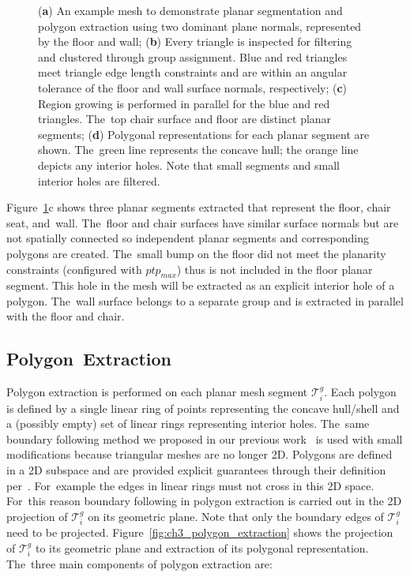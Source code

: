 \begin{figure}[H]
  \caption{(\textbf{a}) An example mesh to demonstrate planar segmentation and polygon extraction using two dominant plane normals, represented by the floor and wall;
  (\textbf{b}) Every triangle is inspected for filtering and clustered through group assignment. Blue and red triangles meet triangle edge length constraints and are within an angular tolerance of the floor and wall surface normals, respectively; (\textbf{c}) Region growing is performed in parallel for the blue and red triangles. The~top chair surface and floor are distinct planar segments;  (\textbf{d}) Polygonal representations for each planar segment are shown. The~green line represents the concave hull; the orange line depicts any interior holes. Note that small segments and small interior holes are filtered. 
  }\label{fig:ch3_planar_segmenti}
\end{figure}

Figure~\ref{fig:ch3_planar_segmenti}c shows three planar segments extracted that represent the floor, chair seat, and~wall. The~floor and chair surfaces have similar surface normals but are not spatially connected so independent planar segments and corresponding polygons are created. The~small bump on the floor did not meet the planarity constraints (configured with $ptp_{max}$) thus is not included in the floor planar segment. This hole in the mesh will be extracted as an explicit interior hole of a polygon. The~wall surface belongs to a separate group and is extracted in parallel with the floor and chair. 

\subsection{Polygon~Extraction}\label{sec:ch3_methods_polylidar_polygon_extraction}

Polygon extraction is performed on each planar mesh segment $\mathcal{T}^{g}_i$. Each polygon is defined by a single linear ring of points representing the concave hull/shell and a (possibly empty) set of linear rings representing interior holes. The~same boundary following method we proposed in our previous work~\cite{castagno_polylidar_2020} is used with small modifications because triangular meshes are no longer 2D.  Polygons are defined in a 2D subspace and are provided explicit guarantees through their definition per~\cite{herring_opengis_2006-1}. For~example the edges in linear rings must not cross in this 2D space.  For~this reason boundary following in polygon extraction is carried out in the 2D projection of $\mathcal{T}^{g}_i$ on its geometric plane. Note that only the boundary edges of $\mathcal{T}^{g}_i$ need to be projected. Figure~\ref{fig:ch3_polygon_extraction} shows the projection of $\mathcal{T}^{g}_i$ to its geometric plane and extraction of its polygonal representation. The~three main components of polygon extraction are:

